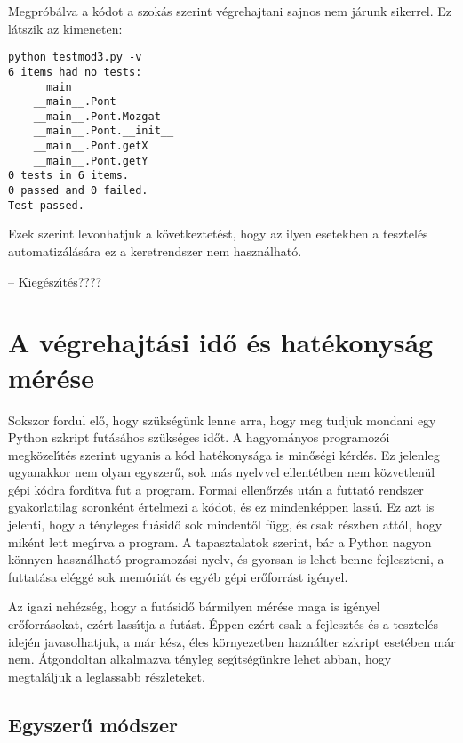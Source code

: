 \noindent Megpr\'ob\'alva a k\'odot a szok\'as szerint v\'egrehajtani sajnos nem j\'arunk sikerrel. Ez 
l\'atszik az kimeneten:

\begin{Verbatim}[fontsize=\small]
python testmod3.py -v
6 items had no tests:
    __main__
    __main__.Pont
    __main__.Pont.Mozgat
    __main__.Pont.__init__
    __main__.Pont.getX
    __main__.Pont.getY
0 tests in 6 items.
0 passed and 0 failed.
Test passed.
\end{Verbatim}

\noindent Ezek szerint levonhatjuk a k\"ovetkeztet\'est, hogy az ilyen esetekben a tesztel\'es 
automatiz\'al\'as\'ara ez a keretrendszer nem haszn\'alhat\'o.

-- Kieg\'esz\'{\i}t\'es????

\section{A v\'egrehajt\'asi id\H{o} \'es hat\'ekonys\'ag m\'er\'ese}

Sokszor fordul el\H{o}, hogy sz\"uks\'eg\"unk lenne arra, hogy meg tudjuk mondani egy Python szkript 
fut\'as\'ahos sz\"uks\'eges id\H{o}t. A hagyom\'anyos programoz\'oi megk\"ozel\'{\i}t\'es szerint 
ugyanis a k\'od hat\'ekonys\'aga is min\H{o}s\'egi k\'erd\'es. Ez jelenleg ugyanakkor nem olyan 
egyszer\H{u}, sok m\'as nyelvvel ellent\'etben nem k\"ozvetlen\"ul g\'epi k\'odra ford\'{\i}tva 
fut a program. Formai ellen\H{o}rz\'es ut\'an a futtat\'o rendszer gyakorlatilag soronk\'ent 
\'ertelmezi a k\'odot, \'es ez mindenk\'eppen lass\'u. Ez azt is jelenti, hogy a t\'enyleges 
fu\'asid\H{o} sok mindent\H{o}l f\"ugg, \'es csak r\'eszben att\'ol, hogy mik\'ent lett meg\'{\i}rva 
a program. A tapasztalatok szerint, b\'ar a Python nagyon k\"onnyen haszn\'alhat\'o programoz\'asi 
nyelv, \'es gyorsan is lehet benne fejleszteni, a futtat\'asa el\'egg\'e sok mem\'ori\'at  \'es 
egy\'eb g\'epi er\H{o}forr\'ast ig\'enyel.

Az igazi neh\'ezs\'eg, hogy a fut\'asid\H{o} b\'armilyen m\'er\'ese maga is ig\'enyel 
er\H{o}for\-r\'asokat, ez\'ert lass\'{\i}tja a fut\'ast. \'Eppen ez\'ert csak a fejleszt\'es 
\'es a tesztel\'es idej\'en javasolhatjuk, a m\'ar k\'esz, \'eles k\"ornyezetben hazn\'alter 
szkript eset\'eben m\'ar nem. \'Atgondoltan alkalmazva t\'enyleg seg\'{\i}ts\'eg\"unkre lehet 
abban, hogy megtal\'aljuk a leglassabb r\'eszleteket. 

\subsection{Egyszer\H{u} m\'odszer}

